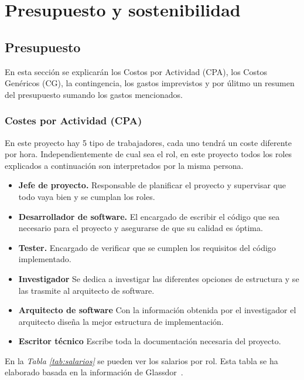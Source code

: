 \documentclass[12pt]{article}
\begin{document}
    \section{Presupuesto y sostenibilidad}
    \subsection{Presupuesto}
    En esta sección se explicarán los Costos por Actividad (CPA), los Costos Genéricos (CG), la contingencia, los gastos imprevistos y por úlitmo un resumen del presupuesto sumando los gastos mencionados.
    \subsubsection{Costes por Actividad (CPA)}
    En este proyecto hay 5 tipo de trabajadores, cada uno tendrá un coste diferente por hora. Independientemente de cual sea el rol, en este proyecto todos los roles explicados a continuación son interpretados por la misma persona.
    \begin{itemize}
        \item \textbf{Jefe de proyecto.} Responsable de planificar el proyecto y supervisar que todo vaya bien y se cumplan los roles.
        \item \textbf{Desarrollador de software.} El encargado de escribir el código que sea necesario para el proyecto y asegurarse de que su calidad es óptima.
        \item \textbf{Tester.} Encargado de verificar que se cumplen los requisitos del código implementado.
        \item \textbf{Investigador} Se dedica a investigar las diferentes opciones de estructura y se las trasmite al arquitecto de software.
        \item \textbf{Arquitecto de software} Con la información obtenida por el investigador el arquitecto diseña la mejor estructura de implementación.
        \item \textbf{Escritor técnico} Escribe toda la documentación necesaria del proyecto.
    \end{itemize}
    En la \textit{Tabla \ref{tab:salarios}} se pueden ver los salarios por rol. Esta tabla se ha elaborado basada en la información de Glassdor~\cite{7}.
\end{document}
